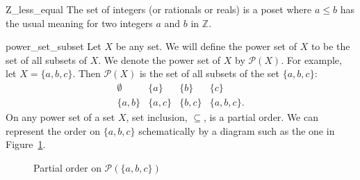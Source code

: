 \begin{example}{Z_less_equal}
The set of integers (or rationals  or reals) is a poset where $a \leq  b$ has the usual meaning for two integers $a$ and $b$ in ${\mathbb Z}$.
\end{example}


\begin{example}{power_set_subset}
Let $X$ be any set.  We will define the {\bfi power set\/} of $X$ to be the set of all subsets of $X$. We denote the power set of $X$ by ${\mathcal P}(X)$. For example, let $X = \{ a, b, c \}$.  Then ${\mathcal P}(X)$ is  the set of all subsets of the set  $\{ a, b, c \}$: 
\[
\begin{array}{cccc}
\emptyset & \{ a \} & \{ b \} & \{ c \} \\
\{ a, b \} & \{ a, c\} &\{ b, c\} & \{ a, b, c \}.
\end{array}
\]
On any power set of a set $X$, set inclusion, $\subseteq$, is a partial order.  We can represent the order on $\{ a, b, c \}$ schematically by a diagram such as the one in  Figure~\ref{partial}. 
\end{example}

\begin{figure}[htb]
\begin{center}
\end{center}
\caption{Partial order on ${\mathcal P}( \{ a, b, c \})$}
\label{partial}
\end{figure}


